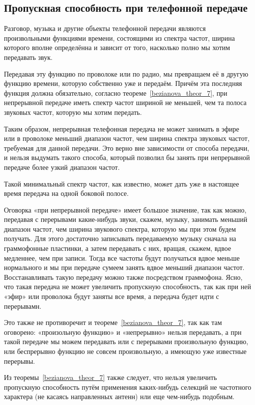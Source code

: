 \subsection*{Пропускная способность при телефонной передаче}
\qquad Разговор, музыка и другие объекты телефонной передачи являются произвольными функциями времени, состоящими из спектра частот, ширина которого вполне определённа и зависит от того, насколько полно мы хотим передавать звук.

Передавая эту функцию по проволоке или по радио, мы превращаем её в другую функцию времени, которую собственно уже и передаём. Причём эта последняя функция должна обязательно, согласно теореме~\ref{bezianova_theor_7}, при непрерывной передаче иметь спектр частот шириной не меньшей, чем та полоса звуковых частот, которую мы хотим передать.

Таким образом, непрерывная телефонная передача не может занимать в эфире или в проволоке меньший диапазон частот, чем ширина спектра звуковых частот, требуемая для данной передачи. Это верно вне зависимости от способа передачи, и нельзя выдумать такого способа, который позволил бы занять при непрерывной передаче более узкий диапазон частот.

Такой минимальный спектр частот, как известно, может дать уже в настоящее время передача на одной боковой полосе.

Оговорка «при непрерывной передаче» имеет большое значение, так как можно, передавая с перерывами какие-нибудь звуки, скажем, музыку, занимать меньший диапазон частот, чем ширина звукового спектра, которую мы при этом будем получать. Для этого достаточно записывать передаваемую музыку сначала на граммофонные пластинки, а затем передавать с них, вращая, скажем, вдвое медленнее, чем при записи. Тогда все частоты будут получаться вдвое меньше нормального и мы при передаче сумеем занять вдвое меньший диапазон частот. Восстанавливать такую передачу можно также посредством граммофона. Ясно, что такая передача не может увеличить пропускную способность, так как при ней «эфир» или проволока будут заняты все время, а передача будет идти с перерывамн.

Это также не противоречит и теореме~\ref{bezianova_theor_7}, так как там оговорено: «произольную функцию» и «непрерывно» нельзя передавать, а прн такой передаче мы можем передавать или с перерывами произвольную функцию, нли беспрерывно функцию не совсем произвольную, а имеющую уже известные перерывы.

Из теоремы~\ref{bezianova_theor_7} также следует, что нельзя увеличить пропускную способность путём применения каких-нибудь селекций не частотного характера (не касаясь направленных антенн) нли еще чем-нибудь подобным.

